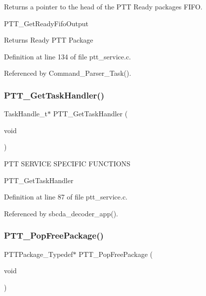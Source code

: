 Returns a pointer to the head of the P\+TT Ready packages F\+I\+FO. 

P\+T\+T\+\_\+\+Get\+Ready\+Fifo\+Output

\begin{DoxyReturn}{Returns}
Ready P\+TT Package 
\end{DoxyReturn}


Definition at line 134 of file ptt\+\_\+service.\+c.



Referenced by Command\+\_\+\+Parser\+\_\+\+Task().

\mbox{\label{group___p_t_t___service_ga438acb18ecae08bcac2d185a98a52177}} 
\subsubsection{\texorpdfstring{P\+T\+T\+\_\+\+Get\+Task\+Handler()}{PTT\_GetTaskHandler()}}
{\footnotesize\ttfamily Task\+Handle\+\_\+t$\ast$ P\+T\+T\+\_\+\+Get\+Task\+Handler (\begin{DoxyParamCaption}\item[{void}]{ }\end{DoxyParamCaption})}



 P\+TT S\+E\+R\+V\+I\+CE S\+P\+E\+C\+I\+F\+IC F\+U\+N\+C\+T\+I\+O\+NS 



P\+T\+T\+\_\+\+Get\+Task\+Handler 

Definition at line 87 of file ptt\+\_\+service.\+c.



Referenced by sbcda\+\_\+decoder\+\_\+app().

\mbox{\label{group___p_t_t___service_gaa7e0c4bca58c6133c9fbb281ec291ffd}} 
\subsubsection{\texorpdfstring{P\+T\+T\+\_\+\+Pop\+Free\+Package()}{PTT\_PopFreePackage()}}
{\footnotesize\ttfamily P\+T\+T\+Package\+\_\+\+Typedef$\ast$ P\+T\+T\+\_\+\+Pop\+Free\+Package (\begin{DoxyParamCaption}\item[{void}]{ }\end{DoxyParamCaption})}



